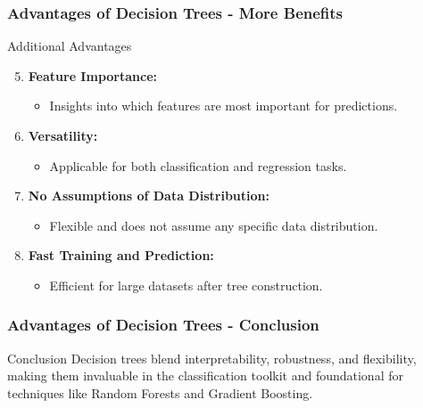 \documentclass[aspectratio=169]{beamer}
\begin{document}
\begin{frame}[fragile]
    \frametitle{Advantages of Decision Trees - More Benefits}
    \begin{block}{Additional Advantages}
        \begin{enumerate}
            \setcounter{enumi}{4} %
            \item \textbf{Feature Importance:}
                \begin{itemize}
                    \item Insights into which features are most important for predictions.
                \end{itemize}
            \item \textbf{Versatility:}
                \begin{itemize}
                    \item Applicable for both classification and regression tasks.
                \end{itemize}
            \item \textbf{No Assumptions of Data Distribution:}
                \begin{itemize}
                    \item Flexible and does not assume any specific data distribution.
                \end{itemize}
            \item \textbf{Fast Training and Prediction:}
                \begin{itemize}
                    \item Efficient for large datasets after tree construction.
                \end{itemize}
        \end{enumerate}
    \end{block}
\end{frame}

\begin{frame}[fragile]
    \frametitle{Advantages of Decision Trees - Conclusion}
    \begin{block}{Conclusion}
        Decision trees blend interpretability, robustness, and flexibility, making them invaluable in the classification toolkit and foundational for techniques like Random Forests and Gradient Boosting.
    \end{block}
\end{frame}
\end{document}
